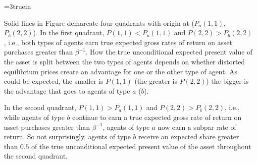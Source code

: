 \centerline{\epsfxsize=3truein}
\caption{Share ${\frac{\Gamma_b}{\Gamma}}$ of the true unconditional expected 
present value of the asset that agents of type $b$ 
are expected to receive, as a function of  true transition 
probabilities $P(1,1)$ and $P(2,2)$. The dashed curve 
is the isoquant for a share equal to $0.5$, and the 
solid lines demarcate four quadrants with  origin 
at the subjective beliefs $P_a(1,1)=0.5$ and 
$P_b(2,2)=0.75$.}
\endfigure

Solid lines in Figure  demarcate four
quadrants with  origin at ($P_a(1,1)$, $P_b(2,2)$).
In the first quadrant, $P(1,1)<P_a(1,1)$ and 
$P(2,2)>P_b(2,2)$, i.e., both types of agents earn true
expected gross rates of return on asset purchases 
greater than $\beta^{-1}$. How the true unconditional
expected present value of the asset is split between
the two types of agents depends on whether  distorted equilibrium prices create an
advantage for one or the other type of agent. As could  
 be expected, the smaller is $P(1,1)$ (the greater is  
$P(2,2)$) the bigger is the  advantage that goes to agents of 
type $a$ ($b$).

In the second quadrant, $P(1,1)>P_a(1,1)$ and 
$P(2,2)>P_b(2,2)$, i.e., while agents of type $b$
continue to earn a true expected gross rate of 
return on asset purchases greater than $\beta^{-1}$,
agents of type $a$ now earn a subpar rate of 
return. So not surprisingly, agents of type $b$
receive an expected share greater than $0.5$ of 
the true unconditional expected present value of 
the asset throughout the second quadrant.


